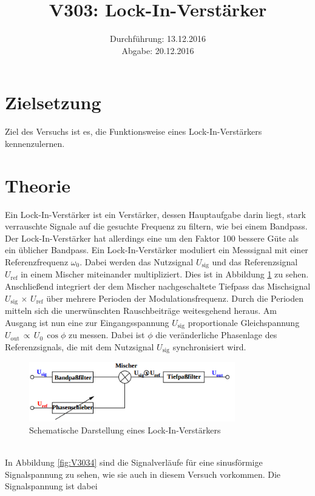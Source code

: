 \documentclass[
  bibliography=totoc,     %
  captions=tableheading,  %
  titlepage=firstiscover, %
]{scrartcl}
\title{V303: Lock-In-Verstärker}
\author{
  Simon Schulte
  \texorpdfstring{
    \\
    \href{mailto:simon.schulte@udo.edu}{simon.schulte@udo.edu}
  }{}
  \texorpdfstring{\and}{, }
  Tim Sedlaczek
  \texorpdfstring{
    \\
    \href{mailto:tim.sedlaczek@udo.edu}{tim.sedlaczek@udo.edu}
  }{}
}
\date{Durchführung: 13.12.2016\\
      Abgabe: 20.12.2016}
\begin{document}
\maketitle
\thispagestyle{empty}
\tableofcontents
\newpage
\section{Zielsetzung}
\label{sec:zielsetzung}
Ziel des Versuchs ist es, die Funktionsweise eines Lock-In-Verstärkers
kennenzulernen.
\section{Theorie}
\label{sec:theorie}
Ein Lock-In-Verstärker ist ein Verstärker, dessen Hauptaufgabe darin liegt,
stark verrauschte Signale auf die gesuchte Frequenz zu filtern, wie bei einem
Bandpass. Der Lock-In-Verstärker hat allerdings eine um den Faktor 100 bessere
Güte als ein üblicher Bandpass.
Ein Lock-In-Verstärker moduliert ein Messsignal mit einer Referenzfrequenz
$\omega_0$. Dabei werden das Nutzsignal $U_\mathup{sig}$ und das Referenzsignal
$U_\mathup{ref}$ in einem Mischer miteinander multipliziert. Dies ist in Abbildung
\ref{fig:V3033} zu sehen. Anschließend integriert der dem Mischer nachgeschaltete
Tiefpass das Mischsignal $U_\mathup{sig}\,\times \, U_\mathup{ref}$ über mehrere Perioden der
Modulationsfrequenz. Durch die Perioden mitteln sich die unerwünschten
Rauschbeiträge weitesgehend heraus. Am Ausgang ist nun eine zur Eingangsspannung
$U_\mathup{sig}$ proportionale Gleichspannung $U_\mathup{out}\,\propto\,U_0\,\cos\phi$ zu
messen. Dabei ist $\phi$ die veränderliche Phasenlage des Referenzsignals, die
mit dem Nutzsignal $U_\mathup{sig}$ synchronisiert wird.
\begin{figure}[htb]
  \centering
  \includegraphics[width=0.8\textwidth]{V3033.png}
  \caption{Schematische Darstellung eines Lock-In-Verstärkers \cite{anleitung}}
  \label{fig:V3033}
\end{figure}\\
In Abbildung \ref{fig:V3034} sind die Signalverläufe für eine sinusförmige
Signalspannung zu sehen, wie sie auch in diesem Versuch vorkommen. Die
Signalspannung ist dabei
\end{document}
